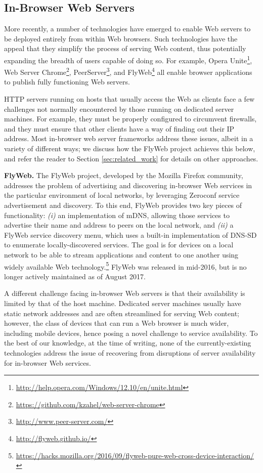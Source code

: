 \subsection{In-Browser Web Servers}
\label{sub:background_in_browser_web_servers}

More recently, a number of technologies have emerged to enable Web servers to be deployed entirely from within Web browsers.
Such technologies have the appeal that they simplify the process of serving Web content, thus potentially expanding the breadth of users capable of doing so.
For example, Opera Unite\footnote{\url{http://help.opera.com/Windows/12.10/en/unite.html}}, Web Server Chrome\footnote{\url{https://github.com/kzahel/web-server-chrome}}, PeerServer\footnote{\url{http://www.peer-server.com/}}, and FlyWeb\footnote{\url{http://flyweb.github.io/}} all enable browser applications to publish fully functioning Web servers.

HTTP servers running on hosts that usually access the Web as clients face a few challenges not normally encountered by those running on dedicated server machines.
For example, they must be properly configured to circumvent firewalls, and they must ensure that other clients have a way of finding out their IP address.
Most in-browser web server frameworks address these issues, albeit in a variety of different ways; we discuss how the FlyWeb project achieves this below, and refer the reader to Section \ref{sec:related_work} for details on other approaches.

\textbf{FlyWeb.}
The FlyWeb project, developed by the Mozilla Firefox community, addresses the problem of advertising and discovering in-browser Web services in the particular environment of local networks, by leveraging Zeroconf service advertisement and discovery.
To this end, FlyWeb provides two key pieces of functionality: 
\textit{(i)} an implementation of mDNS, allowing those services to advertise their name and address to peers on the local network, and 
\textit{(ii)} a FlyWeb service discovery menu, which uses a built-in implementation of DNS-SD to enumerate locally-discovered services.
The goal is for devices on a local network to be able to stream applications and content to one another using widely available Web technology.\footnote{\url{https://hacks.mozilla.org/2016/09/flyweb-pure-web-cross-device-interaction/}}
FlyWeb was released in mid-2016, but is no longer actively maintained as of August 2017.

A different challenge facing in-browser Web servers is that their availability is limited by that of the host machine.
Dedicated server machines usually have static network addresses and are often streamlined for serving Web content; however, the class of devices that can run a Web browser is much wider, including mobile devices, hence posing a novel challenge to service availability.
To the best of our knowledge, at the time of writing, none of the currently-existing technologies address the issue of recovering from disruptions of server availability for in-browser Web services.
